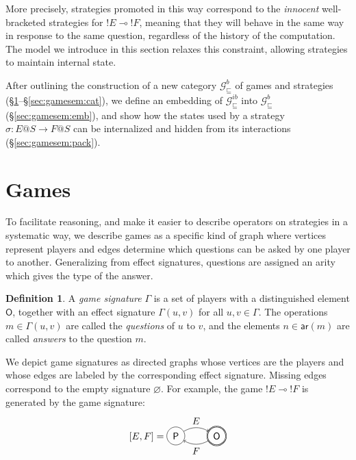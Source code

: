 \documentclass[11pt,oneside,draft]{book}
\theoremstyle{definition}
\newtheorem{definition}[theorem]{Definition}
\newcommand{\gcat}{\mathcal{G}_{\sqsubseteq}}
\newcommand{\kw}[1]{\ensuremath{ \mathsf{#1} }}
\begin{document}
More precisely,
strategies promoted in this way
correspond to the \emph{innocent} well-bracketed strategies for
${!E} \multimap {!F}$,
meaning that they will behave in the same way
in response to the same question,
regardless of the history of the computation.
The model we introduce in this section
relaxes this constraint,
allowing strategies to maintain internal state.

After outlining the construction of a new category $\gcat^b$
of games and strategies
(\S\ref{sec:gamesem:games}--\S\ref{sec:gamesem:cat}),
we define an embedding of
$\gcat^{ib}$ into $\gcat^b$
(\S\ref{sec:gamesem:emb}),
and show how the states used by a strategy
$\sigma : E@S \rightarrow F@S$
can be internalized and
hidden from its interactions
(\S\ref{sec:gamesem:pack}).


\section{Games} \label{sec:gamesem:games} %

To facilitate reasoning,
and make it easier to describe operators on strategies
in a systematic way,
we describe games as a specific kind of graph
where vertices represent players
and edges determine which questions can be asked
by one player to another.
Generalizing from effect signatures,
questions are assigned an arity
which gives the type of the answer.

\begin{definition}
A \emph{game signature} $\Gamma$
is a set of players with a distinguished element $\kw{O}$,
together with an effect signature $\Gamma(u, v)$
for all $u, v \in \Gamma$.
The operations $m \in \Gamma(u, v)$ are called
the \emph{questions} of $u$ to $v$,
and the elements $n \in \kw{ar}(m)$ are called
\emph{answers} to the question $m$.
\end{definition}

We depict game signatures as directed graphs
whose vertices are the players and
whose edges are labeled by the corresponding effect signature.
Missing edges correspond to the empty signature $\varnothing$.
For example,
the game ${!E} \multimap {!F}$ is generated by
the game signature:
\[
  [E,F] =
  \begin{tikzpicture}[baseline=(O.base),scale=1.5]
    \node[circle,draw,double] (O) at (0,0) {$\kw{O}$};
    \node[circle,draw] (P) at (-1,0) {$\kw{P}$};
    \path[->] (P) edge[bend left] node[above] {$E$} (O);
    \path[->] (O) edge[bend left] node[below] {$F$} (P);
  \end{tikzpicture}
\]
\end{document}
